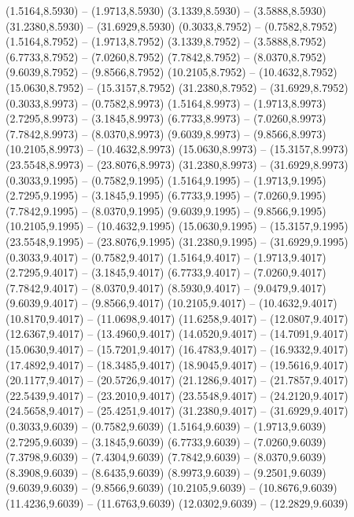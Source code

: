 {\begin{scope}[shift={(#1,#2)}]
    (1.5164,8.5930) -- (1.9713,8.5930)
    (3.1339,8.5930) -- (3.5888,8.5930)
    (31.2380,8.5930) -- (31.6929,8.5930)
    (0.3033,8.7952) -- (0.7582,8.7952)
    (1.5164,8.7952) -- (1.9713,8.7952)
    (3.1339,8.7952) -- (3.5888,8.7952)
    (6.7733,8.7952) -- (7.0260,8.7952)
    (7.7842,8.7952) -- (8.0370,8.7952)
    (9.6039,8.7952) -- (9.8566,8.7952)
    (10.2105,8.7952) -- (10.4632,8.7952)
    (15.0630,8.7952) -- (15.3157,8.7952)
    (31.2380,8.7952) -- (31.6929,8.7952)
    (0.3033,8.9973) -- (0.7582,8.9973)
    (1.5164,8.9973) -- (1.9713,8.9973)
    (2.7295,8.9973) -- (3.1845,8.9973)
    (6.7733,8.9973) -- (7.0260,8.9973)
    (7.7842,8.9973) -- (8.0370,8.9973)
    (9.6039,8.9973) -- (9.8566,8.9973)
    (10.2105,8.9973) -- (10.4632,8.9973)
    (15.0630,8.9973) -- (15.3157,8.9973)
    (23.5548,8.9973) -- (23.8076,8.9973)
    (31.2380,8.9973) -- (31.6929,8.9973)
    (0.3033,9.1995) -- (0.7582,9.1995)
    (1.5164,9.1995) -- (1.9713,9.1995)
    (2.7295,9.1995) -- (3.1845,9.1995)
    (6.7733,9.1995) -- (7.0260,9.1995)
    (7.7842,9.1995) -- (8.0370,9.1995)
    (9.6039,9.1995) -- (9.8566,9.1995)
    (10.2105,9.1995) -- (10.4632,9.1995)
    (15.0630,9.1995) -- (15.3157,9.1995)
    (23.5548,9.1995) -- (23.8076,9.1995)
    (31.2380,9.1995) -- (31.6929,9.1995)
    (0.3033,9.4017) -- (0.7582,9.4017)
    (1.5164,9.4017) -- (1.9713,9.4017)
    (2.7295,9.4017) -- (3.1845,9.4017)
    (6.7733,9.4017) -- (7.0260,9.4017)
    (7.7842,9.4017) -- (8.0370,9.4017)
    (8.5930,9.4017) -- (9.0479,9.4017)
    (9.6039,9.4017) -- (9.8566,9.4017)
    (10.2105,9.4017) -- (10.4632,9.4017)
    (10.8170,9.4017) -- (11.0698,9.4017)
    (11.6258,9.4017) -- (12.0807,9.4017)
    (12.6367,9.4017) -- (13.4960,9.4017)
    (14.0520,9.4017) -- (14.7091,9.4017)
    (15.0630,9.4017) -- (15.7201,9.4017)
    (16.4783,9.4017) -- (16.9332,9.4017)
    (17.4892,9.4017) -- (18.3485,9.4017)
    (18.9045,9.4017) -- (19.5616,9.4017)
    (20.1177,9.4017) -- (20.5726,9.4017)
    (21.1286,9.4017) -- (21.7857,9.4017)
    (22.5439,9.4017) -- (23.2010,9.4017)
    (23.5548,9.4017) -- (24.2120,9.4017)
    (24.5658,9.4017) -- (25.4251,9.4017)
    (31.2380,9.4017) -- (31.6929,9.4017)
    (0.3033,9.6039) -- (0.7582,9.6039)
    (1.5164,9.6039) -- (1.9713,9.6039)
    (2.7295,9.6039) -- (3.1845,9.6039)
    (6.7733,9.6039) -- (7.0260,9.6039)
    (7.3798,9.6039) -- (7.4304,9.6039)
    (7.7842,9.6039) -- (8.0370,9.6039)
    (8.3908,9.6039) -- (8.6435,9.6039)
    (8.9973,9.6039) -- (9.2501,9.6039)
    (9.6039,9.6039) -- (9.8566,9.6039)
    (10.2105,9.6039) -- (10.8676,9.6039)
    (11.4236,9.6039) -- (11.6763,9.6039)
    (12.0302,9.6039) -- (12.2829,9.6039)

\end{scope}}
